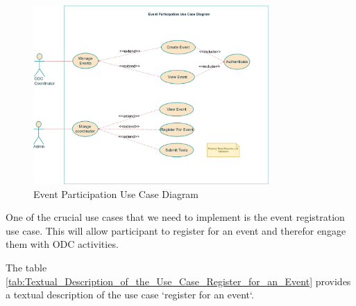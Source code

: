 \begin{figure}[h!]
  \centering
  \includegraphics[width=0.8\textwidth]{images/EventParticipationUseCase.png}
  \caption{Event Participation Use Case Diagram}\label{fig:event_participation_use_case}
\end{figure}

One of the crucial use cases that we need to implement is the event registration use case.
This will allow participant to register for an event and therefor engage them with ODC activities.

The table \ref{tab:Textual_Description_of_the_Use_Case_Register_for_an_Event} provides a textual description of the use case `register for an event`.


